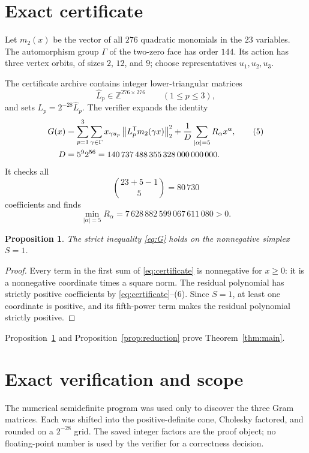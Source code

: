 \documentclass[11pt]{article}
\newtheorem{proposition}[theorem]{Proposition}
\begin{document}
\section{Exact certificate}
Let $m_2(x)$ be the vector of all $276$ quadratic monomials in the $23$
variables.  The automorphism group $\Gamma$ of the two-zero face has order
$144$.  Its action has three vertex orbits, of sizes $2$, $12$, and $9$;
choose representatives $u_1,u_2,u_3$.

The certificate archive contains integer lower-triangular matrices
\[
 \widehat L_p\in\mathbb Z^{276\times276}\qquad(1\le p\le3),
\]
and sets $L_p=2^{-28}\widehat L_p$.  The verifier expands the identity
\begin{align}
 G(x)
 &=\sum_{p=1}^3\sum_{\gamma\in\Gamma}
 x_{\gamma u_p}
 \left\|L_p^{\mathsf T}m_2(\gamma x)\right\|_2^2
 +\frac1D\sum_{|\alpha|=5}R_\alpha x^\alpha,
 \tag{5}\label{eq:certificate}\\
 D&=5^9 2^{56}=140\,737\,488\,355\,328\,000\,000\,000.\notag
\end{align}
It checks all
\[
 \binom{23+5-1}{5}=80\,730
\]
coefficients and finds
\[
 \min_{|\alpha|=5}R_\alpha
 =7\,628\,882\,599\,067\,611\,080>0.
 \tag{6}
\]

\begin{proposition}\label{prop:face}
The strict inequality \eqref{eq:G} holds on the nonnegative simplex $S=1$.
\end{proposition}

\begin{proof}
Every term in the first sum of \eqref{eq:certificate} is nonnegative for
$x\ge0$: it is a nonnegative coordinate times a square norm.  The residual
polynomial has strictly positive coefficients by \eqref{eq:certificate}--(6).
Since $S=1$, at least one coordinate is positive, and its fifth-power term
makes the residual polynomial strictly positive.
\end{proof}

Proposition~\ref{prop:face} and Proposition~\ref{prop:reduction} prove
Theorem~\ref{thm:main}.

\section{Exact verification and scope}
The numerical semidefinite program was used only to discover the three Gram
matrices.  Each was shifted into the positive-definite cone, Cholesky factored,
and rounded on a $2^{-28}$ grid.  The saved integer factors are the proof
object; no floating-point number is used by the verifier for a correctness
decision.
\end{document}
